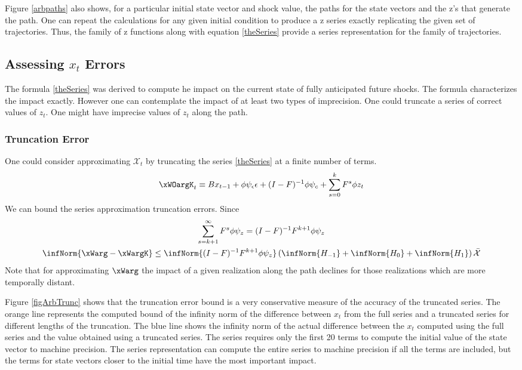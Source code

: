 \documentclass[12pt]{article}
\begin{document}
Figure \ref{arbpaths} also shows, for a particular initial state vector and shock value,  the paths for the state vectors and the  z's that generate the path.
One can repeat the calculations for any given initial condition to produce
a z series exactly replicating the given set of trajectories.  Thus, the family
of z functions along with equation \ref{theSeries} provide a series 
representation for the family of trajectories. 





\subsection{Assessing $x_t$ Errors}
\label{sec:truncationerr}
The formula \ref{theSeries} was derived to compute he impact on the current state of fully anticipated future shocks.  The formula characterizes the impact exactly.  However one can contemplate the impact of at least two types of imprecision.  One could truncate a series of correct values of $z_t$.  One might have imprecise values of $z_t$ along the path.

\subsubsection{Truncation Error}


One could consider approximating $\mathcal{X}_t$ by 
truncating the series \ref{theSeries} at a finite number of terms.
 	 \begin{gather}
 	 \xWOargK_t \equiv B x_{t-1}+ \phi \psi_\epsilon\epsilon  + (I - F)^{-1} \phi \psi_c + \sum_{s=0}^k F^s \phi z_{t}\label{theTruncSeries}
 \end{gather}
We can bound the  series approximation truncation errors.
Since
    \begin{gather}
      \label{eq:1}
\sum_{s=k+1}^{\infty} F^s \phi \psi_z = (I -F)^{-1} F^{k+1}\phi \psi_z       \\
\infNorm{\xWarg-\xWargK} \le \infNorm{(I -F)^{-1} F^{k+1}\phi \psi_z} \left ( \infNorm{H_{-1} }+ \infNorm{H_{0} }+ \infNorm{H_{1} } \right )\bar{\mathcal{X}}
    \end{gather}
Note that for approximating $\xWarg$ the impact of  a given realization along the path declines for those realizations which are  more temporally distant.

 Figure \ref{figArbTrunc} shows
that the truncation error bound is a very conservative measure of the accuracy
of the truncated series.  The orange line represents the computed bound of
the infinity norm of the difference between $x_t$ from the full series and a truncated series for different lengths of the truncation.  The blue line shows the infinity norm of the actual difference between the $x_t$ computed using the full series and the value obtained using a truncated series.  The series requires only the first 20 terms to compute
the initial value of the state vector to machine precision. 
The series representation can compute the entire series to machine precision
if all the terms are included, but the terms for state vectors closer 
to the initial time have the most important impact.
\end{document}
